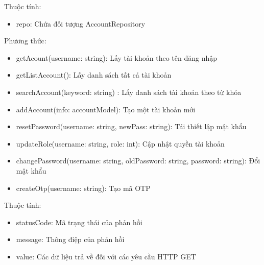 Thuộc tính:
\begin{itemize}
	\item repo: Chứa đối tượng AccountRepository
\end{itemize}
Phương thức:
\begin{itemize}
	\item getAcount(username: string): Lấy tài khoản theo tên đăng nhập
	\item getListAccount(): Lấy danh sách tất cả tài khoản
	\item searchAccount(keyword: string) : Lấy danh sách tài khoản theo từ khóa
	\item addAccount(info: accountModel): Tạo một tài khoản mới
	\item resetPassword(username: string, newPass: string): Tái thiết lập mật khẩu
	\item updateRole(username: string, role: int): Cập nhật quyền tài khoản
	\item changePassword(username: string, oldPassword: string, password: string): Đổi mật khẩu
	\item createOtp(username: string): Tạo mã OTP
\end{itemize}


Thuộc tính:
\begin{itemize}
	\item statusCode: Mã trạng thái của phản hồi
	\item message: Thông điệp của phản hồi
	\item value: Các dữ liệu trả về đối với các yêu cầu HTTP GET
\end{itemize}

\newpage


